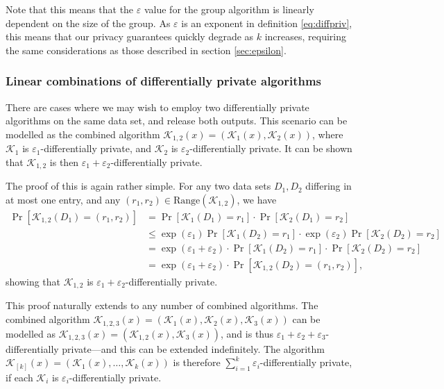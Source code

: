 \documentclass[12pt]{article}
\newcommand{\fancy}{\mathcal}
\renewcommand{\epsilon}{\varepsilon}
\begin{document}
Note that this means that the $\epsilon$ value for the group algorithm is linearly dependent on the size of the group. As $\epsilon$ is an exponent in definition \ref{eq:diffpriv}, this means that our privacy guarantees quickly degrade as $k$ increases, requiring the same considerations as those described in section \ref{sec:epsilon}.

\subsubsection{Linear combinations of differentially private algorithms}

There are cases where we may wish to employ two differentially private algorithms on the same data set, and release both outputs. This scenario can be modelled as the combined algorithm $\fancy{K}_{1,2}(x)=\left(\fancy{K}_1(x), \fancy{K}_2(x)\right)$, where $\fancy{K}_1$ is $\epsilon_1$-differentially private, and $\fancy{K}_2$ is $\epsilon_2$-differentially private. It can be shown that $\fancy{K}_{1,2}$ is then $\epsilon_1+\epsilon_2$-differentially private.

The proof of this is again rather simple. For any two data sets $D_1,D_2$ differing in at most one entry, and any $(r_1,r_2) \in \text{Range}(\fancy{K}_{1,2})$, we have
\begin{align*}
    \Pr[\fancy{K}_{1,2}(D_1)=(r_1,r_2)] &= \Pr[\fancy{K}_1(D_1)=r_1]\cdot\Pr[\fancy{K}_2(D_1)=r_2] \\
        &\leq \exp(\epsilon_1) \Pr[\fancy{K}_1(D_2)=r_1] \cdot \exp(\epsilon_2) \Pr[\fancy{K}_2(D_2)=r_2] \\
        &= \exp(\epsilon_1 + \epsilon_2) \cdot \Pr[\fancy{K}_1(D_2)=r_1] \cdot \Pr[\fancy{K}_2(D_2)=r_2] \\
        &= \exp(\epsilon_1 + \epsilon_2) \cdot \Pr[\fancy{K}_{1,2}(D_2)=(r_1,r_2)],
\end{align*}
showing that $\fancy{K}_{1,2}$ is $\epsilon_1+\epsilon_2$-differentially private.

This proof naturally extends to any number of combined algorithms. The combined algorithm $\fancy{K}_{1,2,3}(x)=\left(\fancy{K}_1(x), \fancy{K}_2(x), \fancy{K}_3(x) \right)$ can be modelled as $\fancy{K}_{1,2,3}(x)=\left(\fancy{K}_{1,2}(x), \fancy{K}_3(x)\right)$, and is thus $\epsilon_1 + \epsilon_2 + \epsilon_3$-differentially private---and this can be extended indefinitely. The algorithm $\fancy{K}_{[k]}(x)=\left(\fancy{K}_1(x), \dots, \fancy{K}_k(x) \right)$ is therefore $\sum_{i=1}^k \epsilon_i$-differentially private, if each $\fancy{K}_i$ is $\epsilon_i$-differentially private. \bigskip
\end{document}
